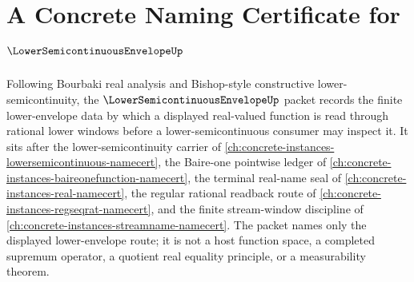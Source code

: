 \chapter{A Concrete Naming Certificate for $\LowerSemicontinuousEnvelopeUp$}
\label{ch:concrete-instances-lower-semicontinuous-envelope-namecert}

Following Bourbaki real analysis and Bishop-style constructive lower-semicontinuity, the $\LowerSemicontinuousEnvelopeUp$ packet records the finite lower-envelope data by which a displayed real-valued function is read through rational lower windows before a lower-semicontinuous consumer may inspect it. It sits after the lower-semicontinuity carrier of \autoref{ch:concrete-instances-lowersemicontinuous-namecert}, the Baire-one pointwise ledger of \autoref{ch:concrete-instances-baireonefunction-namecert}, the terminal real-name seal of \autoref{ch:concrete-instances-real-namecert}, the regular rational readback route of \autoref{ch:concrete-instances-regseqrat-namecert}, and the finite stream-window discipline of \autoref{ch:concrete-instances-streamname-namecert}. The packet names only the displayed lower-envelope route; it is not a host function space, a completed supremum operator, a quotient real equality principle, or a measurability theorem.

